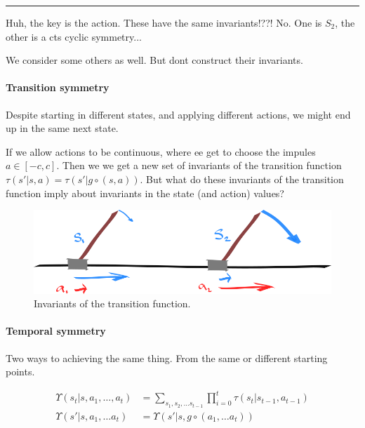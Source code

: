 \begin{center}\rule{0.5\linewidth}{\linethickness}\end{center}


{\color{red}Huh, the key is the action. These have the same invariants!??! No. One is $S_2$, the other is a cts cyclic symmetry...}

We consider some others as well. But dont construct their invariants.

\paragraph{Transition symmetry}

Despite starting in different states, and applying different actions, we might end up in the same next state.

If we allow actions to be continuous, where ee get to choose the impules $a \in [-c, c]$.
Then we we get a new set of invariants of the transition function $\tau(s'|s, a) = \tau(s'|g\circ (s, a))$.
But what do these invariants of the transition function imply about invariants in the state (and action) values?

\begin{figure}[!h]
\centering
\includegraphics[width=1\textwidth,height=0.25\textheight]{../../pictures/drawings/cart-pole-state.png}
\caption{Invariants of the transition function.}
\end{figure}


\paragraph{Temporal symmetry}

Two ways to achieving the same thing. From the same or different starting points.

\begin{align*}
\Upsilon(s_t | s, a_1, \dots, a_t) &= \sum_{s_1, s_2, \dots s_{t-1}}\prod_{i=0}^t \tau(s_t| s_{t-1}, a_{t-1}) \\
\Upsilon(s' | s, a_1, \dots a_t) &= \Upsilon(s' | s, g\circ (a_1, \dots a_t)) \\
\end{align*}

